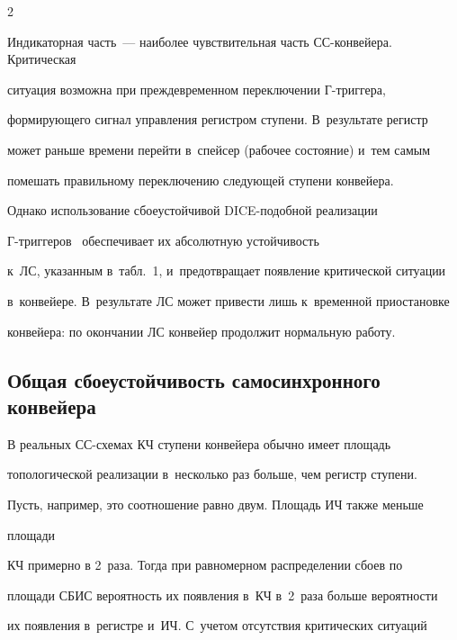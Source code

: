 \begin{multicols}{2}
\vspace*{-2pt}



  Индикаторная часть~--- наиболее чувствительная часть СС-кон\-вей\-ера. Критическая 

ситуация возможна при преж\-де\-вре\-мен\-ном переключении \mbox{Г-триг}\-ге\-ра, 

формирующего сигнал управления регистром ступени. В~результате регистр 

может раньше времени перейти в~спейсер (рабочее состояние) и~тем самым 

помешать правильному переключению сле\-ду\-ющей ступени конвейера.

  

  Однако использование сбоеустойчивой DICE-по\-доб\-ной реализации 

  Г-триг\-ге\-ров~\cite{2-step} обеспечивает их абсолютную устойчивость 

  к~ЛС, указанным в~табл.~1, и~предотвращает появление критической ситуации 

  в~конвейере. В~результате ЛС может привести лишь к~временной приостановке 

конвейера: по окончании ЛС конвейер продолжит нормальную работу.



\vspace*{-6pt}

  

\subsection{Общая сбоеустойчивость самосинхронного конвейера}



\vspace*{-2pt}



  В реальных СС-схемах КЧ ступени конвейера обычно имеет площадь 

топологической реализации в~несколько раз больше, чем регистр ступени. 

Пусть, например, это соотношение равно двум. Площадь ИЧ также меньше 

площади

КЧ примерно в 2~раза. Тогда при равномерном распределении сбоев по 

площади СБИС вероятность их появления в~КЧ в~2~раза больше вероятности 

их появления в~регистре и~ИЧ. С~учетом отсутствия критических ситуаций 


\end{multicols}

